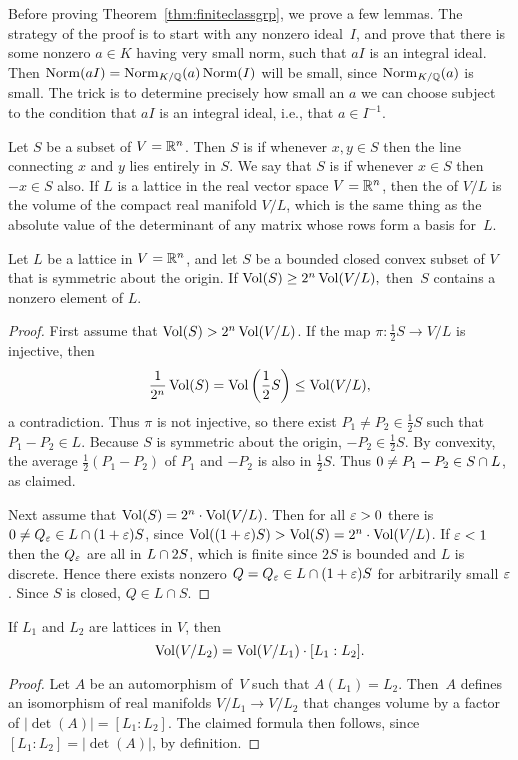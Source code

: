 Before proving Theorem~\ref{thm:finiteclassgrp}, we prove a few
lemmas.  The strategy of the proof is to start with any nonzero
ideal~$I$, and prove that there is some nonzero $a\in K$ having very
small norm, such that $aI$ is an integral ideal. Then
$\operatorname{Norm}(aI)=\operatorname{Norm}_{K/\mathbb{Q}}(a)\operatorname{Norm}(I)$ will be small, since
$\operatorname{Norm}_{K/\mathbb{Q}}(a)$ is small.  The trick is to determine precisely
how small an $a$ we can choose subject to the condition that
$aI$ is an integral ideal, i.e., that $a\in I^{-1}$.

Let $S$ be a subset of $V=\mathbb{R}^n$.  Then $S$ is  if
whenever $x,y\in S$ then the line connecting $x$ and $y$ lies entirely
in $S$.  We say that $S$ is  if
whenever $x\in S$ then $-x\in S$ also.  If $L$ is a lattice in the
real vector space $V=\mathbb{R}^n$, then the  of $V/L$ is the
volume of the compact real manifold $V/L$, which is the same thing as
the absolute value of the determinant of any matrix whose rows form a
basis for~$L$.
\begin{lemma}[Blichfeld]\label{lem:blichfeld}
Let $L$ be a lattice in $V=\mathbb{R}^n$, and let $S$ be a
bounded closed convex subset of $V$ that is symmetric about the
origin.  If
$\operatorname{Vol}(S)\geq 2^n \operatorname{Vol}(V/L),$
then~$S$ contains a nonzero element of $L$.
\end{lemma}
\begin{proof}
First assume that $\operatorname{Vol}(S)>2^n \operatorname{Vol}(V/L)$.
If the map $\pi: \frac{1}{2}S \to V/L$ is injective, then
$$\frac{1}{2^n}\operatorname{Vol}(S) = \operatorname{Vol}\left(\frac{1}{2} S\right)\leq \operatorname{Vol}(V/L),$$
a contradiction.  Thus $\pi$ is not injective, so there
exist $P_1\neq P_2\in \frac{1}{2}S$ such that $P_1-P_2\in L$.
Because $S$ is symmetric about the origin, $-P_2\in \frac{1}{2}S$.  By convexity,
the average $\frac{1}{2}(P_1-P_2)$ of $P_1$ and $-P_2$
is also in $\frac{1}{2}S$.  Thus $0\neq P_1-P_2 \in S\cap L$,
as claimed.

Next assume that $\operatorname{Vol}(S) = 2^n\cdot \operatorname{Vol}(V/L)$.  Then for all
$\varepsilon>0$ there is $0\neq Q_\varepsilon \in L\cap (1+\varepsilon) S$,
since $\operatorname{Vol}((1+\varepsilon)S)>\operatorname{Vol}(S)=2^n\cdot \operatorname{Vol}(V/L)$.
If $\varepsilon<1$ then the $Q_\varepsilon$ are all in $L\cap{} 2 S$,
which is finite since $2S$ is bounded and $L$ is discrete.
Hence there exists nonzero $Q=Q_\varepsilon\in L\cap{} (1+\varepsilon) S$ for arbitrarily
small $\varepsilon$.  Since $S$ is closed, $Q\in L\cap S$.
\end{proof}

\begin{lemma}\label{lem:latticevolchange}
If $L_1$ and $L_2$ are lattices in $V$, then
\[
   \operatorname{Vol}(V/L_2) = \operatorname{Vol}(V/L_1) \cdot [L_1:L_2].
\]
\end{lemma}
\begin{proof}
Let $A$ be an automorphism of~$V$ such that $A(L_1)=L_2$.  Then~$A$
defines an isomorphism of real manifolds $V/L_1\to V/L_2$ that changes
volume by a factor of $\left|\det(A)\right|=[L_1:L_2]$.  The claimed
formula then follows, since $[L_1:L_2] = \left|\det(A)\right|$, by definition.
\end{proof}

